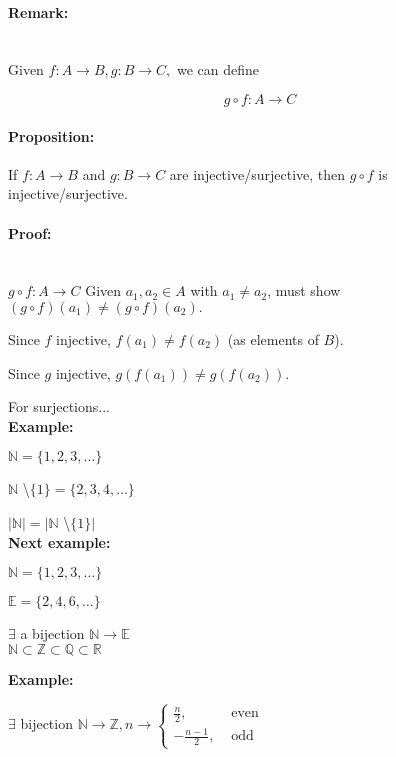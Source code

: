 \documentclass[a4paper, 11pt, twoside]{article}
\begin{document}
\paragraph{Remark:}\ \\

Given $f: A\to B, g: B \to C,$ we can define

\[g\circ f: A\to C\]

\paragraph{Proposition:} If $f: A\to B$ and $g: B\to C$ are injective/surjective, then $g\circ f$ is injective/surjective.\\

\paragraph{Proof:}\ \\
$g\circ f: A\to C$ Given $a_1, a_2\in A$ with $a_1\not= a_2$, must show $(g\circ f)(a_1)\not=(g\circ f)(a_2).$

Since $f$ injective, $f(a_1)\not=f(a_2)$ (as elements of $B$).

Since $g$ injective, $g(f(a_1))\not=g(f(a_2))$.

For surjections...\\

\textbf{Example:}

$\mathbb{N}=\{1, 2, 3, \dots\}$

$\mathbb{N}$ \textbackslash $\{1\} = \{2, 3, 4, \dots\}$

$|\mathbb{N}| = |\mathbb{N}$ \textbackslash $\{1\}|$\\

\textbf{Next example:}

$\mathbb{N}=\{1,2,3,\dots\}$

$\mathbb{E}=\{2, 4, 6,\dots\}$

$\exists$ a bijection $\mathbb{N}\to\mathbb{E}$\\

$\mathbb{N}\subset \mathbb{Z} \subset \mathbb{Q} \subset \mathbb{R}$

\textbf{Example:}

$\exists$ bijection $\mathbb{N}\to\mathbb{Z}, n \to \left.
\begin{cases}
	\frac{n}{2}, &\text{ even}\\
	-\frac{n-1}{2}, &\text{ odd}
\end{cases}
\right.$\\
\end{document}

